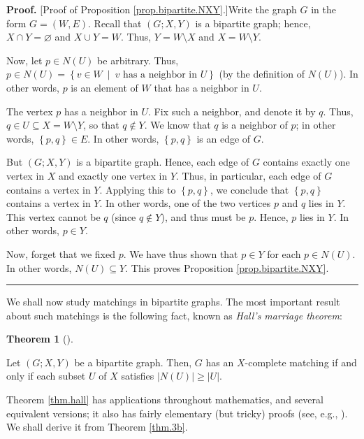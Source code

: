 \documentclass[numbers=enddot,12pt,final,onecolumn,notitlepage]{scrartcl}%
\theoremstyle{definition}
\newtheorem{theo}{Theorem}[section]
\newenvironment{theorem}[1][]
{\begin{theo}[#1]\begin{leftbar}}
{\end{leftbar}\end{theo}}
\newenvironment{proof}[1][Proof]{\noindent\textbf{#1.} }{\ \rule{0.5em}{0.5em}}
\begin{document}
\begin{proof}
[Proof of Proposition \ref{prop.bipartite.NXY}.]Write the graph $G$ in the
form $G=\left(  W,E\right)  $. Recall that $\left(  G;X,Y\right)  $ is a
bipartite graph; hence, $X\cap Y=\varnothing$ and $X\cup Y=W$. Thus,
$Y=W\setminus X$ and $X=W\setminus Y$.

Now, let $p\in N\left(  U\right)  $ be arbitrary. Thus, $p\in N\left(
U\right)  =\left\{  v\in W\ \mid\ v\text{ has a neighbor in }U\right\}  $ (by
the definition of $N\left(  U\right)  $). In other words, $p$ is an element of
$W$ that has a neighbor in $U$.

The vertex $p$ has a neighbor in $U$. Fix such a neighbor, and denote it by
$q$. Thus, $q\in U\subseteq X=W\setminus Y$, so that $q\notin Y$. We know that
$q$ is a neighbor of $p$; in other words, $\left\{  p,q\right\}  \in E$. In
other words, $\left\{  p,q\right\}  $ is an edge of $G$.

But $\left(  G;X,Y\right)  $ is a bipartite graph. Hence, each edge of $G$
contains exactly one vertex in $X$ and exactly one vertex in $Y$. Thus, in
particular, each edge of $G$ contains a vertex in $Y$. Applying this to
$\left\{  p,q\right\}  $, we conclude that $\left\{  p,q\right\}  $ contains a
vertex in $Y$. In other words, one of the two vertices $p$ and $q$ lies in
$Y$. This vertex cannot be $q$ (since $q\notin Y$), and thus must be $p$.
Hence, $p$ lies in $Y$. In other words, $p\in Y$.

Now, forget that we fixed $p$. We have thus shown that $p\in Y$ for each $p\in
N\left(  U\right)  $. In other words, $N\left(  U\right)  \subseteq Y$. This
proves Proposition \ref{prop.bipartite.NXY}.
\end{proof}

We shall now study matchings in bipartite graphs. The most important result
about such matchings is the following fact, known as \textit{Hall's marriage
theorem}:

\begin{theorem}
\label{thm.hall}Let $\left(  G;X,Y\right)  $ be a bipartite graph. Then, $G$
has an $X$-complete matching if and only if each subset $U$ of $X$ satisfies
$\left\vert N\left(  U\right)  \right\vert \geq\left\vert U\right\vert $.
\end{theorem}

Theorem \ref{thm.hall} has applications throughout mathematics, and several
equivalent versions; it also has fairly elementary (but tricky) proofs (see,
e.g., \cite[\S 12.5.2]{LeLeMe17}). We shall derive it from Theorem
\ref{thm.3b}.
\end{document}
